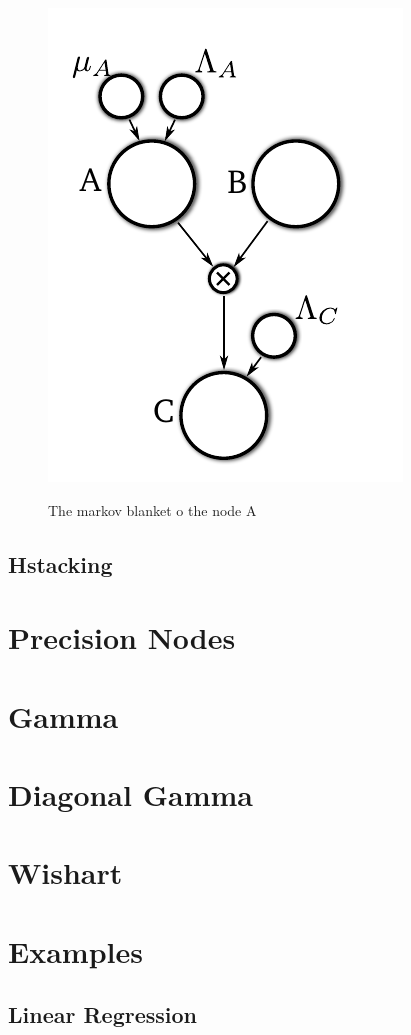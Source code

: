 \documentclass{article}
\begin{document}
\begin{figure}
\includegraphics{images/mult_markov}
\label{fig:mult_markov}
\caption{The markov blanket o the node A}
\end{figure}

\subsection{Hstacking}

\section{Precision Nodes}
\section{Gamma}
\section{Diagonal Gamma}
\section{Wishart}

\section{Examples}
\subsection{Linear Regression}
\end{document}
